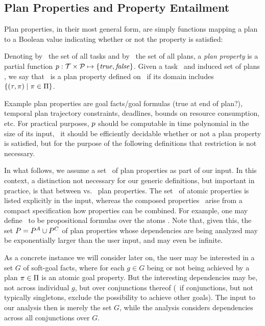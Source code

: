 \subsection{Plan Properties and Property Entailment}

Plan properties, in their most general form, are simply functions
mapping a plan to a Boolean value indicating whether or not the
property is satisfied:

\begin{definition}
Denoting by \alltasks\ the set of all tasks and by \allplans\ the set
of all plans, a \emph{plan property} is a partial function $p :
\cal T \times \cal P \mapsto \{\mathit{true}, \mathit{false}\}$. Given a task
\task\ and induced set of plans \plans, we say that \prop\ is a plan
property defined on \task\ if its domain includes $\{(\tau,\pi) \mid \pi
\in \Pi\}$.
\end{definition}

Example plan properties are goal facts/goal formulas (true at end of
plan?), temporal plan trajectory constraints, deadlines, bounds on
resource consumption, etc. For practical purposes, $p$ should be
computable in time polynomial in the size of its input, \ie\ it should
be efficiently decidable whether or not a plan property is satisfied,
but for the purpose of the following definitions that restriction is
not necessary.

In what follows, we assume a set \props\ of plan properties as part of
our input. In this context, a distinction not necessary for our
generic definitions, but important in practice, is that between
 vs.\  plan properties. The set
\propsatom\ of atomic properties is listed explicitly in the input,
whereas the composed properties \propscomp\ arise from a compact
specification how properties can be combined. For example, one may
define \propscomp\ to be propositional formulas over the atoms
\propsatom. Note that, given this, the set $P = P^A \cup
P^C$ of plan properties whose dependencies are being analyzed
may be exponentially larger than the user input, and may even be
infinite.

As a concrete instance we will consider later on, the user may be
interested in a set $G$ of soft-goal facts, where for each $g \in G$
being or not being achieved by a plan $\pi \in \Pi$ is an atomic
goal property. But the interesting dependencies may be, not across
individual $g$, but over conjunctions thereof (\eg\ if conjunctions,
but not typically singletons, exclude the possibility to achieve other
goals). The input to our analysis then is merely the set $G$, while
the analysis considers dependencies across all conjunctions over $G$.

